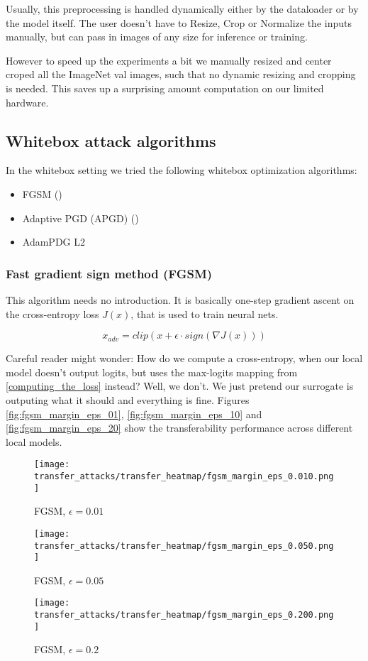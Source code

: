 Usually, this preprocessing is handled dynamically either by the dataloader or by the model itself. The user doesn't have to Resize, Crop or Normalize the inputs manually, but can pass in images of any size for inference or training.

However to speed up the experiments a bit we manually resized and center croped all the ImageNet val images, such that no dynamic resizing and cropping is needed. This saves up a surprising amount computation on our limited hardware.

\subsection{Whitebox attack algorithms}
In the whitebox setting we tried the following whitebox optimization algorithms:

\begin{itemize}
    \item FGSM (\cite{goodfellow2015explaining})
    \item Adaptive PGD (APGD) (\cite{croce2020reliable})
    \item AdamPDG L2
\end{itemize}


\subsubsection{Fast gradient sign method (FGSM)}
This algorithm needs no introduction.
It is basically one-step gradient ascent on the cross-entropy loss $J(x)$, that is used to train neural nets. 

$$x_{adv} = clip(x + \epsilon \cdot sign(\nabla J(x)))$$


Careful reader might wonder: How do we compute a cross-entropy, when our local model doesn't output logits, but uses the max-logits mapping from \ref{computing_the_loss} instead? Well, we don't. We just pretend our surrogate is outputing what it should and everything is fine. Figures \ref{fig:fgsm_margin_eps_01}, \ref{fig:fgsm_margin_eps_10} and \ref{fig:fgsm_margin_eps_20} show the transferability performance across different local models.

\begin{figure}[!htb]
  \texttt{[image: transfer\_attacks/transfer\_heatmap/fgsm\_margin\_eps\_0.010.png]}
  \caption{FGSM, $\epsilon = 0.01$}\label{fig:fgsm_margin_eps_01}
\endminipage\hfill
{}
  \texttt{[image: transfer\_attacks/transfer\_heatmap/fgsm\_margin\_eps\_0.050.png]}
  \caption{FGSM, $\epsilon = 0.05$}\label{fig:fgsm_margin_eps_05}
\endminipage\hfill
{}%
  \texttt{[image: transfer\_attacks/transfer\_heatmap/fgsm\_margin\_eps\_0.200.png]}
  \caption{FGSM, $\epsilon = 0.2$}\label{fig:fgsm_margin_eps_2}
\endminipage
\end{figure}


